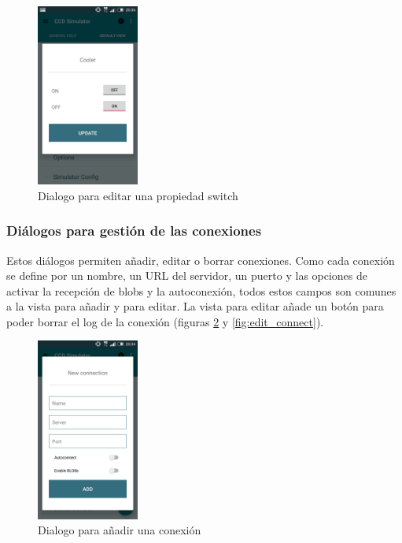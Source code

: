 \begin{figure}[!ht]
  \begin{center}
  \includegraphics[width=0.3\textwidth]{../images/switch_edit_view.png}
  \caption{Dialogo para editar una propiedad switch}
  \label{fig:number_edit}
  \end{center}
\end{figure}

\bigskip
\subsubsection{Diálogos para gestión de las conexiones}

Estos diálogos permiten añadir, editar o borrar conexiones. Como cada conexión se define por un nombre, un URL del servidor, un puerto y las opciones de activar la recepción de blobs y la autoconexión, todos estos campos son comunes a la vista para añadir y para editar. La vista para editar añade un botón para poder borrar el log de la conexión (figuras \ref{fig:new_connect} y \ref{fig:edit_connect}).


\begin{figure}[!ht]
  \begin{center}
  \includegraphics[width=0.3\textwidth]{../images/nueva_conexion.png}
  \caption{Dialogo para añadir una conexión}
  \label{fig:new_connect}
  \end{center}
\end{figure}


